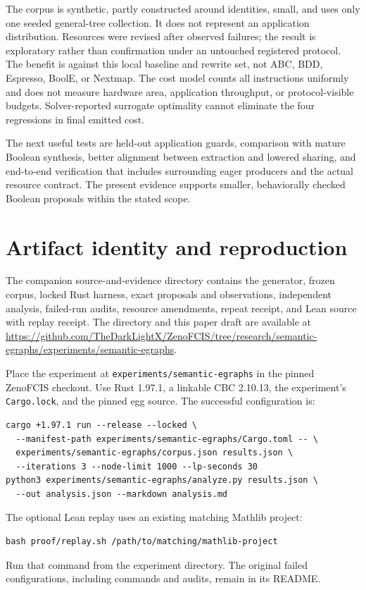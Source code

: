 \documentclass[11pt]{article}
\begin{document}
The corpus is synthetic, partly constructed around identities, small, and uses
only one seeded general-tree collection. It does not represent an application
distribution. Resources were revised after observed failures; the result is
exploratory rather than confirmation under an untouched registered protocol.
The benefit is against this local baseline and rewrite set, not ABC, BDD,
Espresso, BoolE, or Nextmap. The cost model counts all instructions uniformly
and does not measure hardware area, application throughput, or protocol-visible
budgets. Solver-reported surrogate optimality cannot eliminate the four
regressions in final emitted cost.

The next useful tests are held-out application guards, comparison with mature
Boolean synthesis, better alignment between extraction and lowered sharing,
and end-to-end verification that includes surrounding eager producers and the
actual resource contract. The present evidence supports smaller, behaviorally
checked Boolean proposals within the stated scope.

\appendix
\section{Artifact identity and reproduction}

The companion source-and-evidence directory contains the generator, frozen
corpus, locked Rust harness, exact proposals and observations, independent
analysis, failed-run audits, resource amendments, repeat receipt, and Lean
source with replay receipt. The directory and this paper draft are available at
\url{https://github.com/TheDarkLightX/ZenoFCIS/tree/research/semantic-egraphs/experiments/semantic-egraphs}.

Place the experiment at \texttt{experiments/semantic-egraphs} in the pinned
ZenoFCIS checkout. Use Rust 1.97.1, a linkable CBC 2.10.13, the experiment's
\texttt{Cargo.lock}, and the pinned egg source. The successful configuration is:
\begin{verbatim}
cargo +1.97.1 run --release --locked \
  --manifest-path experiments/semantic-egraphs/Cargo.toml -- \
  experiments/semantic-egraphs/corpus.json results.json \
  --iterations 3 --node-limit 1000 --lp-seconds 30
python3 experiments/semantic-egraphs/analyze.py results.json \
  --out analysis.json --markdown analysis.md
\end{verbatim}
The optional Lean replay uses an existing matching Mathlib project:
\begin{verbatim}
bash proof/replay.sh /path/to/matching/mathlib-project
\end{verbatim}
Run that command from the experiment directory. The original failed
configurations, including commands and audits, remain in its README.
\end{document}
